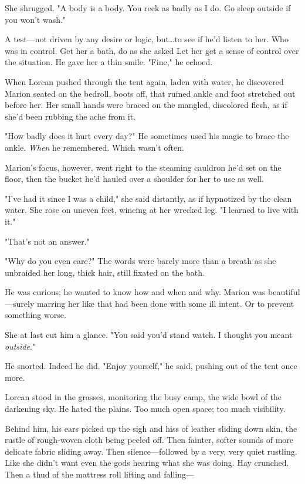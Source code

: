 She shrugged.
"A body is a body.
You reek as badly as I do.
Go sleep outside if you won't wash."

A test---not driven by any desire or logic, but\ldots to see if he'd listen to her.
Who was in control.
Get her a bath, do as she asked  Let her get a sense of control over the situation.
He gave her a thin smile.
"Fine," he echoed.

When Lorcan pushed through the tent again, laden with water, he discovered Marion seated on the bedroll, boots off, that ruined ankle and foot stretched out before her.
Her small hands were braced on the mangled, discolored flesh, as if she'd been rubbing the ache from it.

"How badly does it hurt every day?"
He sometimes used his magic to brace the ankle.
\emph{When} he remembered.
Which wasn't often.

Marion's focus, however, went right to the steaming cauldron he'd set on the floor, then the bucket he'd hauled over a shoulder for her to use as well.

"I've had it since I was a child," she said distantly, as if hypnotized by the clean water.
She rose on uneven feet, wincing at her wrecked leg.
"I learned to live with it."

"That's not an answer."

"Why do you even care?"
The words were barely more than a breath as she unbraided her long, thick hair, still fixated on the bath.

He was curious; he wanted to know how and when and why.
Marion was beautiful---surely marring her like that had been done with some ill intent.
Or to prevent something worse.

She at last cut him a glance.
"You said you'd stand watch.
I thought you meant \emph{outside}."

He snorted.
Indeed he did.
"Enjoy yourself," he said, pushing out of the tent once more.

Lorcan stood in the grasses, monitoring the busy camp, the wide bowl of the darkening sky.
He hated the plains.
Too much open space; too much visibility.

Behind him, his ears picked up the sigh and hiss of leather sliding down skin, the rustle of rough-woven cloth being peeled off.
Then fainter, softer sounds of more delicate fabric sliding away.
Then silence---followed by a very, very quiet rustling.
Like she didn't want even the gods hearing what she was doing.
Hay crunched.
Then a thud of the mattress roll lifting and falling---

